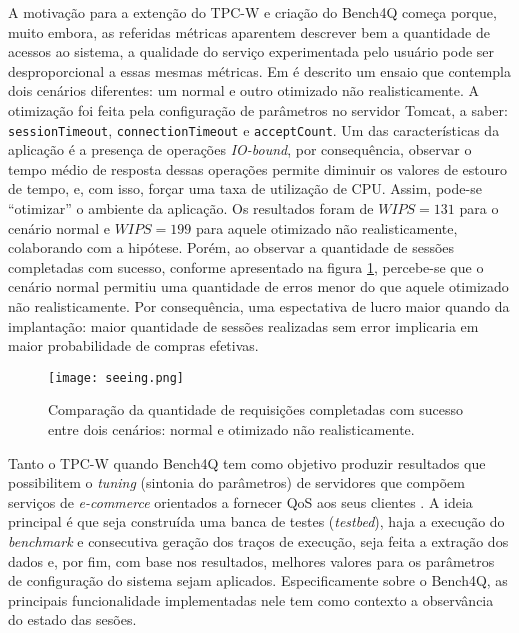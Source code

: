 A motivação para a extenção do TPC-W e criação do Bench4Q começa porque, muito embora, as referidas métricas aparentem descrever bem a quantidade de acessos ao sistema, a qualidade do serviço experimentada pelo usuário pode ser desproporcional a essas mesmas métricas. Em \cite{bench4qslides} é descrito um ensaio que contempla dois cenários diferentes: um normal e outro otimizado não realisticamente. A otimização foi feita pela configuração de parâmetros no servidor Tomcat, a saber: \texttt{sessionTimeout}, \texttt{connectionTimeout} e \texttt{acceptCount}. Um das características da aplicação é a presença de operações \textit{ IO-bound}, por consequência, observar o tempo médio de resposta dessas operações permite diminuir os valores de estouro de tempo, e, com isso, forçar uma taxa de utilização de CPU. Assim, pode-se ``otimizar'' o ambiente da aplicação. Os resultados foram de $WIPS = 131$ para o cenário normal e $WIPS=199$ para aquele otimizado não realisticamente, colaborando com a hipótese. Porém, ao observar a quantidade de sessões completadas com sucesso, conforme apresentado na figura \ref{fig:seeing}, percebe-se que o cenário normal permitiu uma quantidade de erros menor do que aquele otimizado não realisticamente. Por consequência, uma espectativa de lucro maior quando da implantação: maior quantidade de sessões realizadas sem error implicaria em maior probabilidade de compras efetivas.

\begin{figure}[htb]
	\centering
	\texttt{[image: seeing.png]}
	\caption{Comparação da quantidade de requisições completadas com sucesso entre dois cenários: normal e otimizado não realisticamente.}
	\label{fig:seeing}
\end{figure}


Tanto o TPC-W quando Bench4Q tem como objetivo produzir resultados que possibilitem o \textit{tuning} (sintonia do parâmetros) de servidores que compõem serviços de \textit{e-commerce} orientados a fornecer QoS aos seus clientes \cite{Menasce2002, Zhang2011}.  A ideia principal é que seja construída uma banca de testes (\textit{testbed}), haja a execução do \textit{ benchmark} e consecutiva geração dos traços de execução, seja feita a extração dos dados e, por fim, com base nos resultados, melhores valores para os parâmetros de configuração do sistema sejam aplicados. Especificamente sobre o Bench4Q, as principais funcionalidade implementadas nele tem como contexto a observância do estado das sesões.

